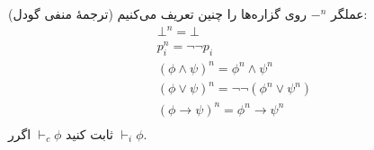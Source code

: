 (ترجمهٔ منفی گودل)
عملگر $\mathord{-}^n$ روی گزاره‌ها را چنین تعریف می‌کنیم:
\begin{gather*}
    \bot^n=\bot\\
    p_i^n=\neg\neg p_i\\
    (\phi\wedge\psi)^n=\phi^n\wedge\psi^n\\
    (\phi\vee\psi)^n=\neg\neg(\phi^n\vee\psi^n)\\
    (\phi\to\psi)^n=\phi^n\to\psi^n\\
\end{gather*}
ثابت کنید $\vdash_c\phi$ اگرر $\vdash_i\phi$.
